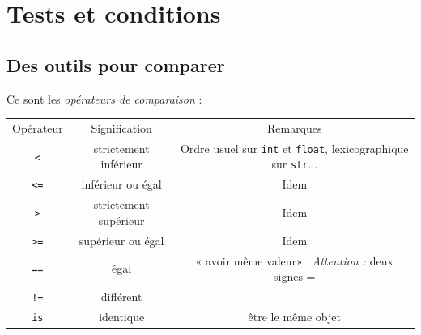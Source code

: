 \chapter{Tests et conditions}
\section{Des outils pour comparer}

Ce sont les \textit{opérateurs de comparaison} :\\

{\small
\tabstyle[UGLiBlue]
\begin{tabular}{CCC}
	\ccell Opérateur            & \ccell Signification  & \ccell Remarques                                                                                                        \\

	\texttt{<}      & strictement inférieur & Ordre usuel sur \texttt{int} et \texttt{float}, lexicographique sur \texttt{str}... \\

	\texttt{<=}     & inférieur ou égal     & Idem                                                                                                                    \\

	\texttt{>}      & strictement supérieur & Idem                                                                                                                    \\

	\texttt{>=}     & supérieur ou égal     & Idem                                                                                                                    \\

	\texttt{==}     & égal                  & « avoir même valeur» \  \textit{Attention :} deux signes =                                                              \\

	\texttt{!=}     & différent             &                                                                                                                         \\

	\texttt{is}     & identique             & être le même objet                                                                                                      \\


\end{tabular}}
